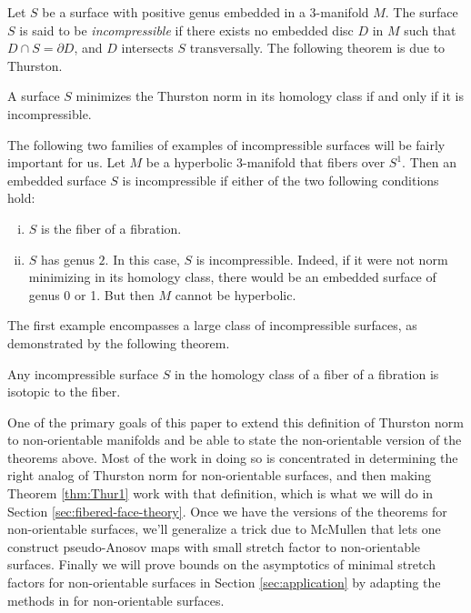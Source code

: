 Let $S$ be a surface with positive genus embedded in a $3$-manifold $M$.  The surface $S$ is said to be {\it incompressible} if there
  exists no embedded disc $D$ in $M$ such that $D \cap S = \partial D$, and $D$ intersects $S$ transversally.  The following theorem is due to Thurston.
\begin{thm}
  A surface $S$ minimizes the Thurston norm in its homology class if and only if it is incompressible.
\end{thm}

 The following two families of examples of incompressible surfaces will be fairly important for us.
  Let $M$ be a hyperbolic $3$-manifold that fibers over $S^1$. Then an embedded surface $S$ is incompressible
  if either of the two following conditions hold:
  \begin{enumerate}[(i)]
  \item $S$ is the fiber of a fibration.
  \item $S$ has genus $2$. In this case, $S$ is incompressible.  Indeed, if it were not norm minimizing in its homology
    class, there would be an embedded surface of genus 0 or 1. But then $M$ cannot be hyperbolic.
  \end{enumerate}

The first example encompasses a large class of incompressible surfaces, as demonstrated by the following theorem.
\begin{thm}
  \label{thm:ThurIsotope}
  Any incompressible surface $S$ in the homology class of a fiber of a fibration is isotopic to the fiber.
\end{thm}

 One of the primary goals of this paper to extend this definition of Thurston norm to non-orientable manifolds
and be able to state the non-orientable version of the theorems above. Most of the work in doing so is
concentrated in determining the right analog of Thurston norm for non-orientable surfaces, and then making
Theorem \ref{thm:Thur1} work with that definition, which is what we will do in Section \ref{sec:fibered-face-theory}. Once we have the
versions of the theorems for non-orientable surfaces, we'll generalize a trick due
to McMullen that lets one construct pseudo-Anosov maps with small stretch factor to non-orientable surfaces. Finally we will prove
bounds on the asymptotics of minimal stretch factors for non-orientable surfaces in Section
\ref{sec:application} by adapting the methods in \cite{yazdi2018pseudo} for non-orientable surfaces.
